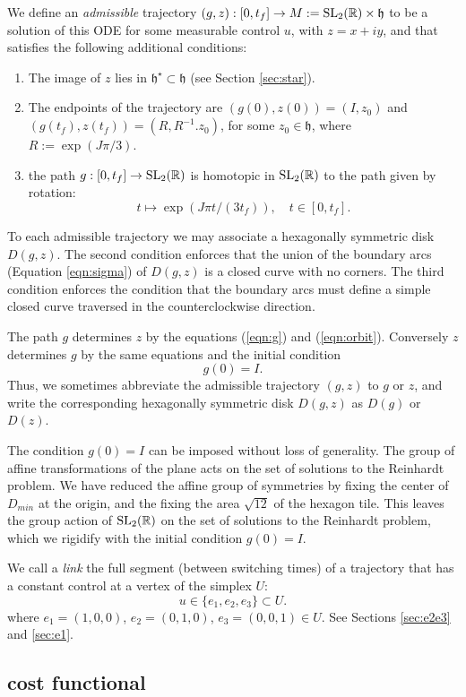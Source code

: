\documentclass{article}
\theoremstyle{remark}
\newcommand{\ring}[1]{\mathbb{#1}}
\newcommand{\op}[1]{\hbox{#1}}
\def\SL{\op{SL}_2(\ring{R})}
\def\h{\mathfrak h}
\def\hstar{{\mathfrak h}^\star}
\def\DR{D_{min}}
\begin{document}
We define an {\it admissible} trajectory $(g,z):[0,t_f]\to M:=
\SL\times\h$ to be a solution of this ODE for some measurable control
$u$, with $z=x+iy$, and that satisfies the following additional
conditions:
\begin{enumerate}
\item The image of $z$ lies in $\hstar\subset \h$ (see Section
  \ref{sec:star}).
  \item The endpoints of the trajectory are $(g(0),z(0))=(I,z_0)$ and
    $(g(t_f),z(t_f))=(R,R^{-1}.z_0)$, for some $z_0\in \h$, where $R:=
    \exp(J\pi/3)$.  
\item the path
  $g:[0,t_f]\to\SL$ is homotopic in $\SL$ to the path
  given by rotation:
\[
t\mapsto \exp(J \pi t/(3 t_f)),\quad t\in [0,t_f].
\]
\end{enumerate}
To each admissible trajectory we may associate a hexagonally symmetric
disk $D(g,z)$.  The second condition enforces that the union of the
boundary arcs (Equation \ref{eqn:sigma}) of $D(g,z)$ is a closed curve
with no corners.  The third condition enforces the condition that the
boundary arcs must define a simple closed curve traversed in the
counterclockwise direction.

The path $g$ determines $z$ by the equations (\ref{eqn:g}) and
(\ref{eqn:orbit}).  Conversely $z$ determines $g$ by the same
equations and the initial condition
\[
g(0)=I.
\]
Thus, we sometimes abbreviate the admissible trajectory $(g,z)$ to $g$
or $z$, and write the corresponding hexagonally symmetric disk
$D(g,z)$ as $D(g)$ or $D(z)$.

The condition $g(0)=I$ can be imposed without loss of generality.  
The group of affine transformations of the plane acts on the set of 
solutions to the Reinhardt problem.  We have reduced the affine
group of symmetries by fixing the center of $\DR$ at the origin, and
the fixing the area $\sqrt{12}$ of the hexagon tile.  This leaves the
group action of $\SL$ on the set of solutions to the Reinhardt
problem, which we rigidify with the initial condition $g(0)=I$.

We call a {\it link} the full segment (between switching times) of a
trajectory that has a constant control at a vertex of the
simplex $U$: 
\[
u\in\{e_1,e_2,e_3\}\subset U.
\]
where $e_1=(1,0,0)$, $e_2=(0,1,0)$, $e_3=(0,0,1)\in U$.
See Sections \ref{sec:e2e3} and \ref{sec:e1}.

\subsection{cost functional}\label{sec:cost}
\end{document}
